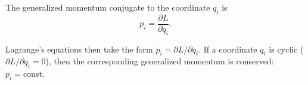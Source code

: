 The generalized momentum conjugate to the coordinate $q_i$ is
$$p_i = \frac{\partial L}{\partial \dot{q}_i}.$$

Lagrange's equations then take the form $\dot{p}_i = \partial L/\partial q_i$. If a coordinate $q_i$ is cyclic ($\partial L/\partial q_i = 0$), then the corresponding generalized momentum is conserved: $p_i = \text{const}$.

